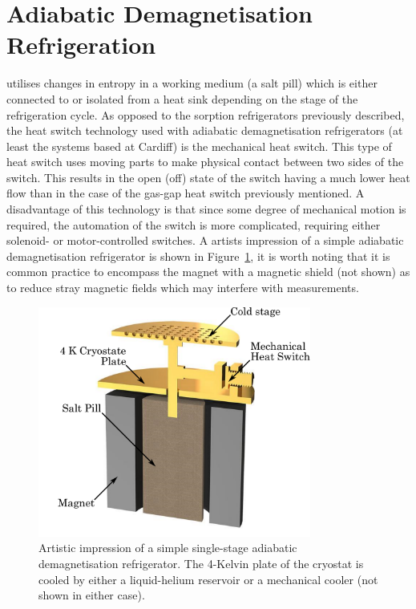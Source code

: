 \section{Adiabatic Demagnetisation Refrigeration}\label{sec:ADR}
 utilises changes in entropy in a working medium (a salt pill) which is either connected to or isolated from a heat sink depending on the stage of the refrigeration cycle. As opposed to the sorption refrigerators previously described, the heat switch technology used with adiabatic demagnetisation refrigerators (at least the systems based at Cardiff) is the mechanical heat switch. This type of heat switch uses moving parts to make physical contact between two sides of the switch. This results in the open (off) state of the switch having a much lower heat flow than in the case of the gas-gap heat switch previously mentioned. A disadvantage of this technology is that since some degree of mechanical motion is required, the automation of the switch is more complicated, requiring either solenoid- or motor-controlled switches. A artists impression of a simple adiabatic demagnetisation refrigerator is shown in Figure~\ref{fig:ADR}, it is worth noting that it is common practice to encompass the magnet with a magnetic shield (not shown) as to reduce stray magnetic fields which may interfere with measurements.
\begin{figure}[tb]
\begin{center}
\includegraphics[width = 0.8\textwidth]{figures/ADR.pdf}
\caption[Artistic impression of a simple single-stage adiabatic demagnetisation refrigerator]{Artistic impression of a simple single-stage adiabatic demagnetisation refrigerator. The 4-Kelvin plate of the cryostat is cooled by either a liquid-helium reservoir or a mechanical cooler (not shown in either case).}
\label{fig:ADR}
\end{center}
\end{figure}
